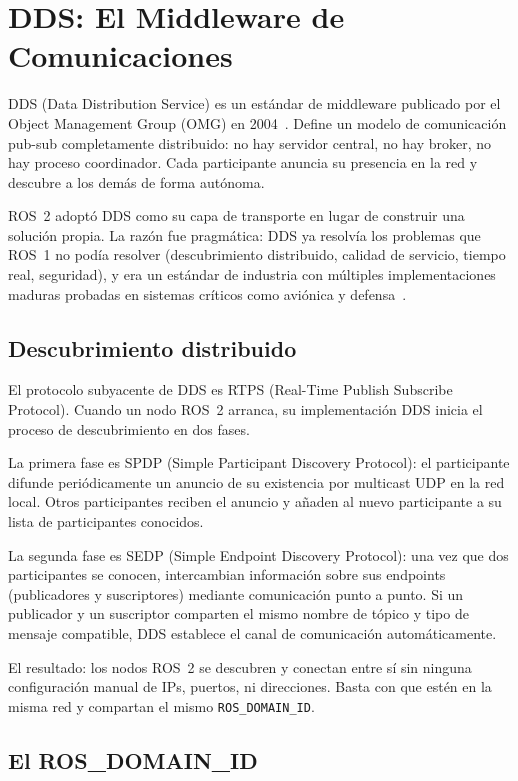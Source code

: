 \section{DDS: El Middleware de Comunicaciones}

DDS (Data Distribution Service) es un estándar de middleware publicado por el Object Management Group (OMG) en 2004~\cite{omg2015dds}. Define un modelo de comunicación pub-sub completamente distribuido: no hay servidor central, no hay broker, no hay proceso coordinador. Cada participante anuncia su presencia en la red y descubre a los demás de forma autónoma.

ROS~2 adoptó DDS como su capa de transporte en lugar de construir una solución propia. La razón fue pragmática: DDS ya resolvía los problemas que ROS~1 no podía resolver (descubrimiento distribuido, calidad de servicio, tiempo real, seguridad), y era un estándar de industria con múltiples implementaciones maduras probadas en sistemas críticos como aviónica y defensa~\cite{macenski2022robot}.

\subsection{Descubrimiento distribuido}

El protocolo subyacente de DDS es RTPS (Real-Time Publish Subscribe Protocol). Cuando un nodo ROS~2 arranca, su implementación DDS inicia el proceso de descubrimiento en dos fases.

La primera fase es SPDP (Simple Participant Discovery Protocol): el participante difunde periódicamente un anuncio de su existencia por multicast UDP en la red local. Otros participantes reciben el anuncio y añaden al nuevo participante a su lista de participantes conocidos.

La segunda fase es SEDP (Simple Endpoint Discovery Protocol): una vez que dos participantes se conocen, intercambian información sobre sus endpoints (publicadores y suscriptores) mediante comunicación punto a punto. Si un publicador y un suscriptor comparten el mismo nombre de tópico y tipo de mensaje compatible, DDS establece el canal de comunicación automáticamente.

El resultado: los nodos ROS~2 se descubren y conectan entre sí sin ninguna configuración manual de IPs, puertos, ni direcciones. Basta con que estén en la misma red y compartan el mismo \texttt{ROS\_DOMAIN\_ID}.

\subsection{El ROS\_DOMAIN\_ID}

